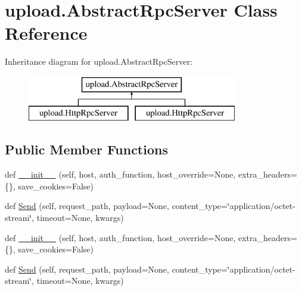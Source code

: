 \hypertarget{classupload_1_1AbstractRpcServer}{}\section{upload.\+Abstract\+Rpc\+Server Class Reference}
\label{classupload_1_1AbstractRpcServer}
Inheritance diagram for upload.\+Abstract\+Rpc\+Server\+:\begin{figure}[H]
\begin{center}
\leavevmode
\includegraphics[height=2.000000cm]{classupload_1_1AbstractRpcServer}
\end{center}
\end{figure}
\subsection*{Public Member Functions}
\begin{DoxyCompactItemize}
\item 
def \mbox{\hyperlink{classupload_1_1AbstractRpcServer_a3f6bc1bd16b52bd5a5c33a1fedeef2d0}{\+\_\+\+\_\+init\+\_\+\+\_\+}} (self, host, auth\+\_\+function, host\+\_\+override=None, extra\+\_\+headers=\{\}, save\+\_\+cookies=False)
\item 
def \mbox{\hyperlink{classupload_1_1AbstractRpcServer_ac1b913f8bd00da4741c47ab49ea94cb5}{Send}} (self, request\+\_\+path, payload=None, content\+\_\+type=\char`\"{}application/octet-\/stream\char`\"{}, timeout=None, kwargs)
\item 
def \mbox{\hyperlink{classupload_1_1AbstractRpcServer_a3f6bc1bd16b52bd5a5c33a1fedeef2d0}{\+\_\+\+\_\+init\+\_\+\+\_\+}} (self, host, auth\+\_\+function, host\+\_\+override=None, extra\+\_\+headers=\{\}, save\+\_\+cookies=False)
\item 
def \mbox{\hyperlink{classupload_1_1AbstractRpcServer_ac1b913f8bd00da4741c47ab49ea94cb5}{Send}} (self, request\+\_\+path, payload=None, content\+\_\+type=\char`\"{}application/octet-\/stream\char`\"{}, timeout=None, kwargs)
\end{DoxyCompactItemize}
